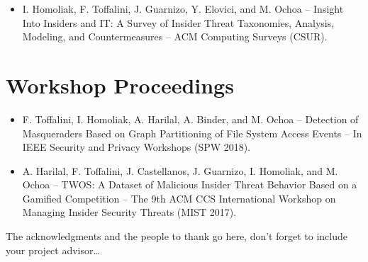 \documentclass[
11pt, %
oneside, %
english, %
singlespacing, %
headsepline, %
]{MastersDoctoralThesis} %
\begin{document}
\begin{publications}
\begin{itemize}
	\item I. Homoliak, F. Toffalini, J. Guarnizo, Y. Elovici, and M. 
	Ochoa -- Insight Into Insiders and IT: A Survey of Insider Threat 
	Taxonomies, Analysis, Modeling, and Countermeasures -- ACM Computing 
	Surveys (CSUR).
	
\end{itemize}

\section*{Workshop Proceedings}
\begin{itemize}
	
	\item F. Toffalini, I. Homoliak, A. Harilal, A. Binder, and M. Ochoa --  
	Detection of Masqueraders Based on Graph Partitioning of File System 
	Access Events -- In IEEE Security and Privacy Workshops (SPW 2018).
	
	\item A. Harilal, F. Toffalini, J. Castellanos, J. Guarnizo, I. Homoliak,  
	and M. Ochoa -- TWOS: A Dataset of Malicious Insider Threat Behavior Based 
	on a Gamified Competition -- The 9th ACM CCS International Workshop on 
	Managing Insider Security Threats (MIST 2017).	
\end{itemize}


\end{publications}


\begin{acknowledgements}
\addchaptertocentry{\acknowledgementname} %

The acknowledgments and the people to thank go here, don't forget to include your project advisor\ldots

\end{acknowledgements}


\tableofcontents %

\listoffigures %
\end{document}
